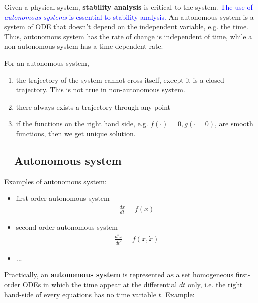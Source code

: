 Given a physical system, {\bf stability analysis} is critical to the
system.
\textcolor{blue}{The use of {\it autonomous systems} is essential to
  stability analysis.}
An autonomous system is a system of ODE that doesn't depend on the
independent variable, e.g. the time. Thus, autonomous system has the
rate of change is independent of time, while a non-autonomous system
has a time-dependent rate.

For an autonomous system,
\begin{enumerate}
\item the trajectory of the system cannot cross itself, except it is a
  closed trajectory. This is not true in non-autonomous system.
\item there always exists a trajectory through any point
\item if the functions on the right hand side,
  e.g. $f(\cdot)=0,g(\cdot=0)$, are smooth functions, then we get unique
  solution. %
\end{enumerate}

\subsection{-- Autonomous system}
\label{sec:autonomous-system}

Examples of autonomous system:
\begin{itemize}
\item first-order autonomous system
  \begin{eqnarray}
    \label{eq:537}
    \frac{dx}{dt} = f(x)
  \end{eqnarray}
\item second-order autonomous system
  \begin{eqnarray}
    \label{eq:538}
    \frac{d^2x}{dt^2} = f(x,\dot{x})
  \end{eqnarray}
\item ...
\end{itemize}

Practically, an {\bf autonomous system} is represented as a set
homogeneous first-order ODEs in which the time appear at the
differential $dt$ only, i.e. the right hand-side of every equations
has no time variable $t$. Example:

